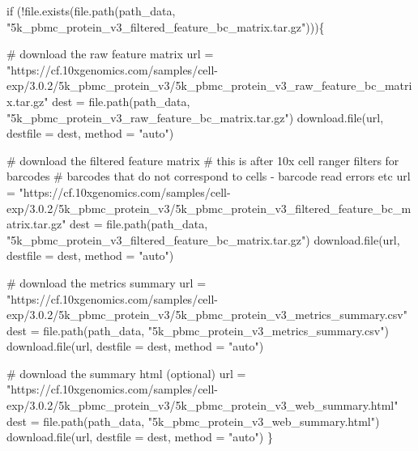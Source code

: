 \documentclass[
  letterpaper,
  DIV=11,
  numbers=noendperiod]{scrartcl}
\newenvironment{Shaded}{\begin{snugshade}}{\end{snugshade}}
\newcommand{\AttributeTok}[1]{\textcolor[rgb]{0.40,0.45,0.13}{#1}}
\newcommand{\CommentTok}[1]{\textcolor[rgb]{0.37,0.37,0.37}{#1}}
\newcommand{\ControlFlowTok}[1]{\textcolor[rgb]{0.00,0.23,0.31}{#1}}
\newcommand{\FunctionTok}[1]{\textcolor[rgb]{0.28,0.35,0.67}{#1}}
\newcommand{\NormalTok}[1]{\textcolor[rgb]{0.00,0.23,0.31}{#1}}
\newcommand{\OtherTok}[1]{\textcolor[rgb]{0.00,0.23,0.31}{#1}}
\newcommand{\SpecialCharTok}[1]{\textcolor[rgb]{0.37,0.37,0.37}{#1}}
\newcommand{\StringTok}[1]{\textcolor[rgb]{0.13,0.47,0.30}{#1}}
\begin{document}
\begin{Shaded}
\begin{Highlighting}[]
\ControlFlowTok{if}\NormalTok{ (}\SpecialCharTok{!}\FunctionTok{file.exists}\NormalTok{(}\FunctionTok{file.path}\NormalTok{(path\_data, }\StringTok{"5k\_pbmc\_protein\_v3\_filtered\_feature\_bc\_matrix.tar.gz"}\NormalTok{)))\{}
  
  \CommentTok{\# download the raw feature matrix}
\NormalTok{  url }\OtherTok{=} \StringTok{"https://cf.10xgenomics.com/samples/cell{-}exp/3.0.2/5k\_pbmc\_protein\_v3/5k\_pbmc\_protein\_v3\_raw\_feature\_bc\_matrix.tar.gz"}
\NormalTok{dest }\OtherTok{=} \FunctionTok{file.path}\NormalTok{(path\_data, }\StringTok{"5k\_pbmc\_protein\_v3\_raw\_feature\_bc\_matrix.tar.gz"}\NormalTok{)}
\FunctionTok{download.file}\NormalTok{(url,      }\AttributeTok{destfile =}\NormalTok{ dest, }\AttributeTok{method =} \StringTok{"auto"}\NormalTok{)}

  \CommentTok{\# download the filtered feature matrix}
  \CommentTok{\# this is after 10x cell ranger filters for barcodes }
  \CommentTok{\# barcodes that do not correspond to cells {-} barcode read errors etc}
\NormalTok{  url }\OtherTok{=} \StringTok{"https://cf.10xgenomics.com/samples/cell{-}exp/3.0.2/5k\_pbmc\_protein\_v3/5k\_pbmc\_protein\_v3\_filtered\_feature\_bc\_matrix.tar.gz"}
\NormalTok{  dest }\OtherTok{=} \FunctionTok{file.path}\NormalTok{(path\_data, }\StringTok{"5k\_pbmc\_protein\_v3\_filtered\_feature\_bc\_matrix.tar.gz"}\NormalTok{)}
  \FunctionTok{download.file}\NormalTok{(url, }\AttributeTok{destfile =}\NormalTok{ dest, }\AttributeTok{method =} \StringTok{"auto"}\NormalTok{)}


\CommentTok{\# download the metrics summary}
\NormalTok{  url }\OtherTok{=} \StringTok{"https://cf.10xgenomics.com/samples/cell{-}exp/3.0.2/5k\_pbmc\_protein\_v3/5k\_pbmc\_protein\_v3\_metrics\_summary.csv"}
\NormalTok{  dest }\OtherTok{=} \FunctionTok{file.path}\NormalTok{(path\_data, }\StringTok{"5k\_pbmc\_protein\_v3\_metrics\_summary.csv"}\NormalTok{)}
  \FunctionTok{download.file}\NormalTok{(url, }\AttributeTok{destfile =}\NormalTok{ dest, }\AttributeTok{method =} \StringTok{"auto"}\NormalTok{)}


\CommentTok{\# download the summary html (optional)}
\NormalTok{  url }\OtherTok{=} \StringTok{"https://cf.10xgenomics.com/samples/cell{-}exp/3.0.2/5k\_pbmc\_protein\_v3/5k\_pbmc\_protein\_v3\_web\_summary.html"}
\NormalTok{  dest }\OtherTok{=} \FunctionTok{file.path}\NormalTok{(path\_data, }\StringTok{"5k\_pbmc\_protein\_v3\_web\_summary.html"}\NormalTok{)}
  \FunctionTok{download.file}\NormalTok{(url, }\AttributeTok{destfile =}\NormalTok{ dest, }\AttributeTok{method =} \StringTok{"auto"}\NormalTok{)}
\NormalTok{\}}
\end{Highlighting}
\end{Shaded}
\end{document}
